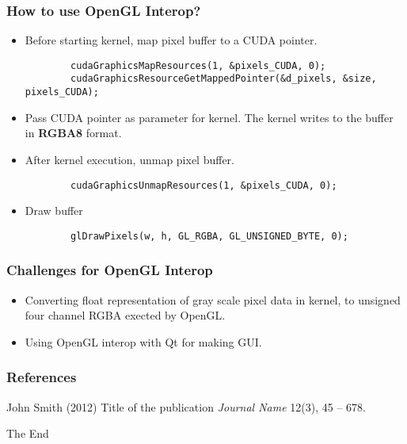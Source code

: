 \documentclass{beamer}
\begin{document}
\begin{frame}[fragile]
	\frametitle{How to use OpenGL Interop?}
	\begin{itemize}
		\item Before starting kernel, map pixel buffer to a CUDA pointer.
		\begin{lstlisting}
		cudaGraphicsMapResources(1, &pixels_CUDA, 0); 
		cudaGraphicsResourceGetMappedPointer(&d_pixels, &size,  pixels_CUDA);
		\end{lstlisting}
		\item Pass CUDA pointer as parameter for kernel. The kernel writes to the buffer in \textbf{RGBA8} format.
		\item After kernel execution, unmap pixel buffer.
		\begin{lstlisting}
		cudaGraphicsUnmapResources(1, &pixels_CUDA, 0);
		\end{lstlisting}
		\item Draw buffer
		\begin{lstlisting}
		glDrawPixels(w, h, GL_RGBA, GL_UNSIGNED_BYTE, 0);
		\end{lstlisting}
	\end{itemize}
\end{frame}

\begin{frame}
	\frametitle{Challenges for OpenGL Interop}
	\begin{itemize}
		\item Converting float representation of gray scale pixel data in kernel, to unsigned four channel RGBA exected by OpenGL.
		\item Using OpenGL interop with Qt for making GUI.
	\end{itemize}
\end{frame}

\begin{frame}
\frametitle{References}
\footnotesize{
\begin{thebibliography}{99} %
 John Smith (2012)
\newblock Title of the publication
\newblock \emph{Journal Name} 12(3), 45 -- 678.
\end{thebibliography}
}
\end{frame}


\begin{frame}
\Huge{\centerline{The End}}
\end{frame}

\end{document}

